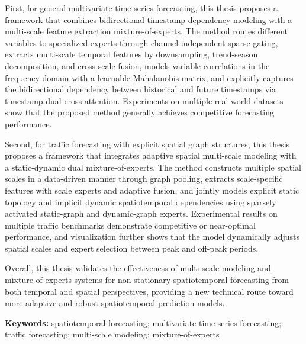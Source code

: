 First, for general multivariate time series forecasting, this thesis proposes a framework that combines bidirectional timestamp dependency modeling with a multi-scale feature extraction mixture-of-experts. The method routes different variables to specialized experts through channel-independent sparse gating, extracts multi-scale temporal features by downsampling, trend-season decomposition, and cross-scale fusion, models variable correlations in the frequency domain with a learnable Mahalanobis matrix, and explicitly captures the bidirectional dependency between historical and future timestamps via timestamp dual cross-attention. Experiments on multiple real-world datasets show that the proposed method generally achieves competitive forecasting performance.

Second, for traffic forecasting with explicit spatial graph structures, this thesis proposes a framework that integrates adaptive spatial multi-scale modeling with a static-dynamic dual mixture-of-experts. The method constructs multiple spatial scales in a data-driven manner through graph pooling, extracts scale-specific features with scale experts and adaptive fusion, and jointly models explicit static topology and implicit dynamic spatiotemporal dependencies using sparsely activated static-graph and dynamic-graph experts. Experimental results on multiple traffic benchmarks demonstrate competitive or near-optimal performance, and visualization further shows that the model dynamically adjusts spatial scales and expert selection between peak and off-peak periods.

Overall, this thesis validates the effectiveness of multi-scale modeling and mixture-of-experts systems for non-stationary spatiotemporal forecasting from both temporal and spatial perspectives, providing a new technical route toward more adaptive and robust spatiotemporal prediction models.

\textbf{Keywords:} spatiotemporal forecasting; multivariate time series forecasting; traffic forecasting; multi-scale modeling; mixture-of-experts
